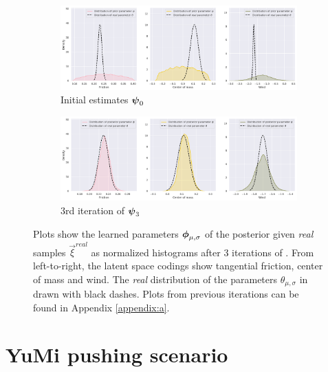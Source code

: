 \begin{figure}[h!]
\centering
\captionsetup{size=footnotesize}
\begin{subfigure}{\linewidth}
  \includegraphics[width=1.0\linewidth]{img/windyslope/latent-representation/new/iter0}
  \caption{Initial estimates $\boldsymbol{\psi}_0$}
  \label{fig_3_parameters_0}
\end{subfigure}
\begin{subfigure}{\textwidth}
  \includegraphics[width=1.0\linewidth]{img/windyslope/latent-representation/new/latent_encoding_iter3}
  \caption{3rd iteration of \dettostoc{} $\boldsymbol{\psi}_3$}
\end{subfigure}
\caption{Plots show the learned parameters $\boldsymbol{\phi}_{\mu, \sigma}$ of the posterior given \emph{real} samples $\vec{\xi}^{real}$ as normalized histograms after 3 iterations of \dettostoc{}.
From left-to-right, the latent space codings show tangential friction, center of mass and wind. %
The \emph{real} distribution of the parameters $\theta_{\mu, \sigma}$ in drawn with black dashes. Plots from previous iterations can be found in Appendix \ref{appendix:a}.}
\label{fig:windyslope_latent_space}
\end{figure}

\clearpage
\section{YuMi pushing scenario}


